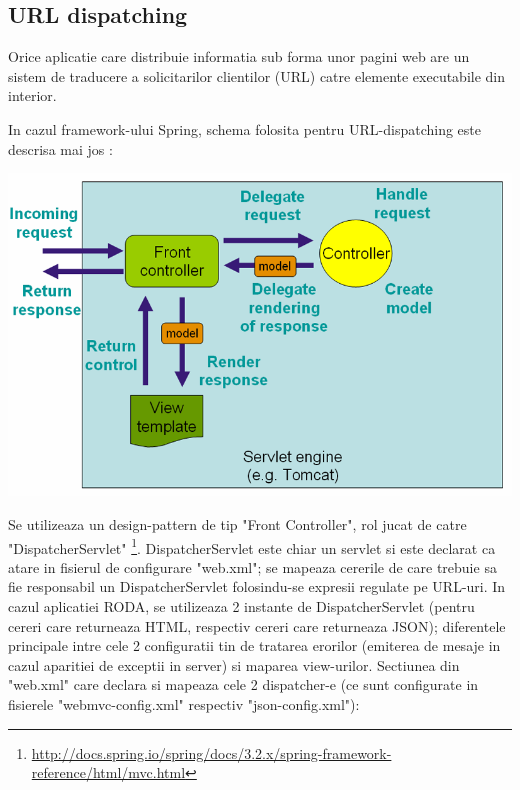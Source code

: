 \subsection{URL dispatching}
\label{url_dispatching}

Orice aplicatie care distribuie informatia sub forma unor pagini web are un sistem de traducere a solicitarilor clientilor (URL) catre elemente executabile din interior. 

In cazul framework-ului Spring, schema folosita pentru URL-dispatching este descrisa mai jos :

\bigskip

\begin{center}
\includegraphics[width=\textwidth]{mvc.png}
\end{center}

\bigskip

Se utilizeaza un design-pattern de tip "Front Controller", rol jucat de catre "DispatcherServlet" \footnote{\url{http://docs.spring.io/spring/docs/3.2.x/spring-framework-reference/html/mvc.html}}.
DispatcherServlet este chiar un servlet si este declarat ca atare in fisierul de configurare "web.xml"; se mapeaza cererile de care trebuie sa fie responsabil un DispatcherServlet folosindu-se expresii regulate pe URL-uri.
In cazul aplicatiei RODA, se utilizeaza 2 instante de DispatcherServlet (pentru cereri care returneaza HTML, respectiv cereri care returneaza JSON); 
diferentele principale intre cele 2 configuratii tin de tratarea erorilor (emiterea de mesaje in cazul aparitiei de exceptii in server) si maparea view-urilor.
Sectiunea din "web.xml" care declara si mapeaza cele 2 dispatcher-e (ce sunt configurate in fisierele "webmvc-config.xml" respectiv "json-config.xml"):

